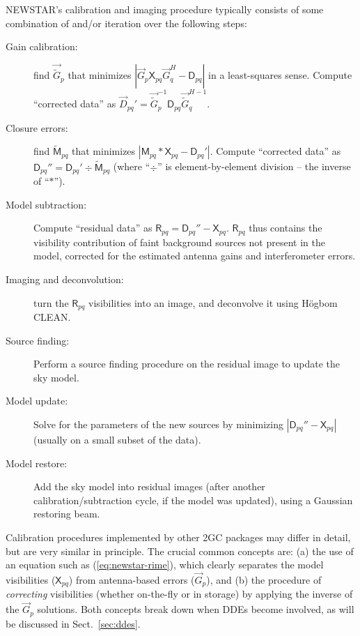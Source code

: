 \documentclass{aa}
\newcommand{\herm}{H}
\newcommand{\jones}[2]{\vec {#1}_{#2}}
\newcommand{\jonesinv}[2]{\vec {#1}^{-1}_{#2}}
\newcommand{\jonesT}[2]{\vec {#1}^{\herm}_{#2}}
\newcommand{\jonesTinv}[2]{\vec {#1}^{{\herm}-1}_{#2}}
\newcommand{\coh}[2]{\mathsf{{#1}}_{{#2}}}
\begin{document}
NEWSTAR's calibration and imaging procedure typically consists of some combination of and/or iteration over the following steps:

\begin{description}

\item[Gain calibration:] find $\jones{\tilde{G}}{p}$ that minimizes $|\jones{G}{p}\coh{X}{pq}\jonesT{G}{q} - \coh{D}{pq}|$ in a least-squares sense. Compute ``corrected data'' as $\jones{D}{pq}' = \jonesinv{\tilde{G}}{p} \coh{D}{pq} \jonesTinv{\tilde{G}}{q}.$

\item[Closure errors:] find $\coh{\tilde{M}}{pq}$ that minimizes $|\coh{M}{pq} \ast \coh{X}{pq} - \coh{D}{pq}'|$.
Compute ``corrected data'' as $\coh{D}{pq}'' = \coh{D}{pq}' \div \coh{\tilde{M}}{pq}$ (where ``$\div$'' is element-by-element division -- the inverse of ``$\ast$'').

\item[Model subtraction:] Compute ``residual data'' as $\coh{R}{pq} = \coh{D}{pq}'' - \coh{X}{pq}$. $\coh{R}{pq}$ thus contains the visibility contribution of faint background sources not present in the model, corrected for the estimated antenna gains and interferometer errors.

\item[Imaging and deconvolution:] turn the $\coh{R}{pq}$ visibilities into an image, and deconvolve it using H\"ogbom CLEAN. 

\item[Source finding:] Perform a source finding procedure on the residual image to update the sky model.

\item[Model update:] Solve for the parameters of the new sources by minimizing $|\coh{D}{pq}'' - \coh{X}{pq}|$ (usually on a small subset of the data).

\item[Model restore:] Add the sky model into residual images (after another calibration/subtraction cycle, if the model was updated), using a Gaussian restoring beam.

\end{description}

Calibration procedures implemented by other 2GC packages may differ in detail, but are very similar in principle. The crucial common concepts are: (a) the use of an equation such as (\ref{eq:newstar-rime}), which clearly separates the model visibilities ($\coh{X}{pq}$) from antenna-based errors ($\jones{G}{p}$), and (b) the procedure of \emph{correcting} visibilities (whether on-the-fly or in storage) by applying the inverse of the $\jones{G}{p}$ solutions. Both concepts break down when DDEs become involved, as will be discussed in Sect.~\ref{sec:ddes}.
\end{document}
